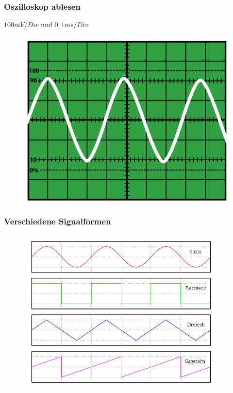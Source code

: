 \begin{frame}
  \frametitle{Oszilloskop ablesen}
  \begin{center}
    $100mV / Div$ und $0,1ms / Div$\\
    \begin{figure}
      \includegraphics[width=.8\textwidth,height=.65\textheight,keepaspectratio]{a16/OsziTon.png}
    \end{figure}
  \end{center}
\end{frame}

\begin{frame}
  \frametitle{Verschiedene Signalformen}
  \begin{center}
    \begin{figure}
      \includegraphics[width=0.95\textwidth,height=.75\textheight,keepaspectratio]{a16/Signalformen.png}
    \end{figure}
  \end{center}
\end{frame}

